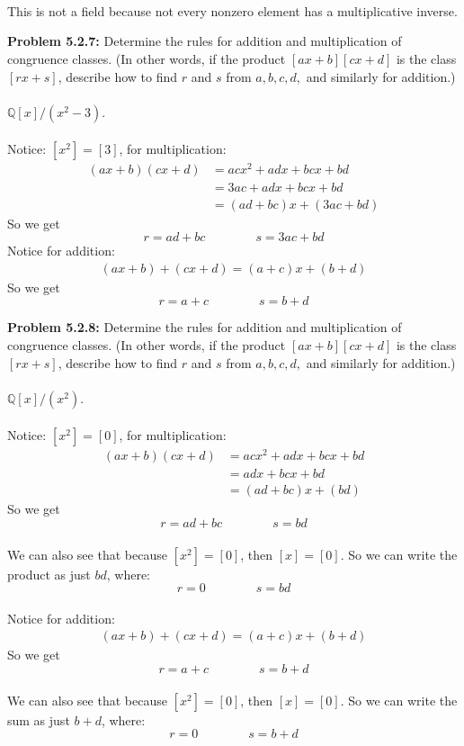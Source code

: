\documentclass[12pt]{article}
\begin{document}
		\normalsize
		\\ \\ \\
		This is not a field because not every nonzero element has a multiplicative inverse.

\newpage 

\noindent \textbf{Problem 5.2.7: }Determine the rules for addition and multiplication of congruence classes. (In other words, if the product $[ax + b][cx + d]$ is the class $[rx + s]$, describe how to find $r$ and $s$ from $a, b, c, d,$ and similarly for addition.) 
\\ \\
$\mathbb{Q}[x]/(x^2 - 3)$.
\\ \\
Notice: $[x^2] = [3]$, for multiplication:
	\begin{align*}
		(ax+b)(cx+d) &= acx^2 + adx + bcx + bd \\
		&= 3ac + adx + bcx + bd \\
		&= (ad + bc)x + (3ac + bd)
	\end{align*}
So we get 
	$$
	r = ad + bc \qquad \qquad s = 3ac + bd
	$$
Notice for addition:
	\begin{align*}
		(ax + b) + (cx + d) = (a + c)x + (b+d)
	\end{align*}
So we get 
	$$
	r = a + c \qquad \qquad s = b + d
	$$
 
\newpage 

\noindent \textbf{Problem 5.2.8: }Determine the rules for addition and multiplication of congruence classes. (In other words, if the product $[ax + b][cx + d]$ is the class $[rx + s]$, describe how to find $r$ and $s$ from $a, b, c, d,$ and similarly for addition.) 
\\ \\
$\mathbb{Q}[x]/(x^2)$.
\\ \\
Notice: $[x^2] = [0]$, for multiplication:
\begin{align*}
(ax+b)(cx+d) &= acx^2 + adx + bcx + bd \\
&= adx + bcx + bd \\
&= (ad + bc)x + (bd)
\end{align*}
So we get 
$$
r = ad + bc \qquad \qquad s =  bd
$$
\\We can also see that because $[x^2] = [0]$, then $[x] = [0]$. So we can write the product as just $bd$, where:
$$
r = 0 \qquad \qquad s = bd
$$
\\Notice for addition:
\begin{align*}
(ax + b) + (cx + d) = (a + c)x + (b+d)
\end{align*}
So we get 
$$
r = a + c \qquad \qquad s = b + d
$$
\\We can also see that because $[x^2] = [0]$, then $[x] = [0]$. So we can write the sum as just $b+d$, where:
$$
r = 0 \qquad \qquad s = b+d
$$
\end{document}
